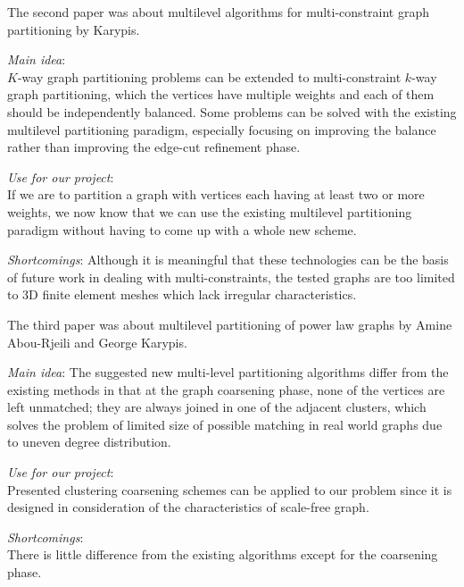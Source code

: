 The second paper was about multilevel algorithms for multi-constraint graph partitioning by Karypis.
\cite{Multi-Constraint}
\begin{itemize*}
\item {\em Main idea}:\\
$K$-way graph partitioning problems can be extended to multi-constraint $k$-way graph partitioning, which the vertices have multiple weights and each of them should be independently balanced. Some problems can be solved with the existing multilevel partitioning paradigm, especially focusing on improving the balance rather than improving the edge-cut refinement phase.
\item {\em Use for our project}:\\
If we are to partition a graph with vertices each having at least two or more weights, we now know that we can use the existing multilevel partitioning paradigm without having to come up with a whole new scheme.
\item {\em Shortcomings}: Although it is meaningful that these technologies can be the basis of future work in dealing with multi-constraints, the tested graphs are too limited to 3D finite element meshes which lack irregular characteristics.
\end{itemize*}

The third paper was about multilevel partitioning of power law graphs by Amine Abou-Rjeili and George Karypis.
\cite{Power-Law_Graphs_Partitioning}
\begin{itemize*}
\item {\em Main idea}: The suggested new multi-level partitioning algorithms differ from the existing methods in that at the graph coarsening phase, none of the vertices are left unmatched; they are always joined in one of the adjacent clusters, which solves the problem of limited size of possible matching in real world graphs due to uneven degree distribution.
\item {\em Use for our project}:\\
Presented clustering coarsening schemes can be applied to our problem since it is designed in consideration of the characteristics of scale-free graph.
\item {\em Shortcomings}:\\
There is little difference from the existing algorithms except for the coarsening phase.
\end{itemize*}

